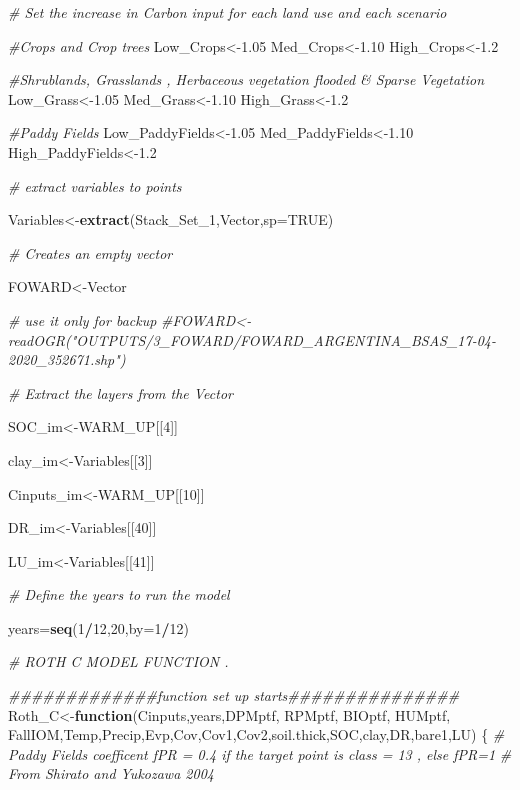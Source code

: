 \documentclass[
  10pt,
  b5paper,
]{book}
\newenvironment{Shaded}{\begin{snugshade}}{\end{snugshade}}
\newcommand{\CommentTok}[1]{\textcolor[rgb]{0.56,0.35,0.01}{\textit{#1}}}
\newcommand{\ControlFlowTok}[1]{\textcolor[rgb]{0.13,0.29,0.53}{\textbf{#1}}}
\newcommand{\DataTypeTok}[1]{\textcolor[rgb]{0.13,0.29,0.53}{#1}}
\newcommand{\DecValTok}[1]{\textcolor[rgb]{0.00,0.00,0.81}{#1}}
\newcommand{\FloatTok}[1]{\textcolor[rgb]{0.00,0.00,0.81}{#1}}
\newcommand{\KeywordTok}[1]{\textcolor[rgb]{0.13,0.29,0.53}{\textbf{#1}}}
\newcommand{\NormalTok}[1]{#1}
\newcommand{\OperatorTok}[1]{\textcolor[rgb]{0.81,0.36,0.00}{\textbf{#1}}}
\newcommand{\OtherTok}[1]{\textcolor[rgb]{0.56,0.35,0.01}{#1}}
\begin{document}
\begin{Shaded}
\begin{Highlighting}[]
\CommentTok{# Set the increase in Carbon input for each land use and each scenario}

\CommentTok{#Crops and Crop trees}
\NormalTok{Low_Crops<-}\FloatTok{1.05}
\NormalTok{Med_Crops<-}\FloatTok{1.10}
\NormalTok{High_Crops<-}\FloatTok{1.2}

\CommentTok{#Shrublands, Grasslands , Herbaceous vegetation flooded & Sparse Vegetation}
\NormalTok{Low_Grass<-}\FloatTok{1.05}
\NormalTok{Med_Grass<-}\FloatTok{1.10}
\NormalTok{High_Grass<-}\FloatTok{1.2}

\CommentTok{#Paddy Fields}
\NormalTok{Low_PaddyFields<-}\FloatTok{1.05}
\NormalTok{Med_PaddyFields<-}\FloatTok{1.10}
\NormalTok{High_PaddyFields<-}\FloatTok{1.2}

\CommentTok{# extract variables to points}

\NormalTok{Variables<-}\KeywordTok{extract}\NormalTok{(Stack_Set_}\DecValTok{1}\NormalTok{,Vector,}\DataTypeTok{sp=}\OtherTok{TRUE}\NormalTok{)}

\CommentTok{# Creates an empty vector}

\NormalTok{FOWARD<-Vector}

\CommentTok{# use it only for backup}
\CommentTok{#FOWARD<-readOGR("OUTPUTS/3_FOWARD/FOWARD_ARGENTINA_BSAS_17-04-2020_352671.shp")}

\CommentTok{# Extract the layers from the Vector}

\NormalTok{SOC_im<-WARM_UP[[}\DecValTok{4}\NormalTok{]]}

\NormalTok{clay_im<-Variables[[}\DecValTok{3}\NormalTok{]] }

\NormalTok{Cinputs_im<-WARM_UP[[}\DecValTok{10}\NormalTok{]]}

\NormalTok{DR_im<-Variables[[}\DecValTok{40}\NormalTok{]]}

\NormalTok{LU_im<-Variables[[}\DecValTok{41}\NormalTok{]]}

\CommentTok{# Define the years to run the model}

\NormalTok{years=}\KeywordTok{seq}\NormalTok{(}\DecValTok{1}\OperatorTok{/}\DecValTok{12}\NormalTok{,}\DecValTok{20}\NormalTok{,}\DataTypeTok{by=}\DecValTok{1}\OperatorTok{/}\DecValTok{12}\NormalTok{)}

\CommentTok{# ROTH C MODEL FUNCTION . }

\CommentTok{#############function set up starts###############}
\NormalTok{Roth_C<-}\ControlFlowTok{function}\NormalTok{(Cinputs,years,DPMptf, RPMptf, BIOptf, HUMptf, FallIOM,Temp,Precip,Evp,Cov,Cov1,Cov2,soil.thick,SOC,clay,DR,bare1,LU)}
\NormalTok{\{}
\CommentTok{# Paddy Fields coefficent fPR = 0.4 if the target point is class = 13 , else fPR=1}
\CommentTok{# From Shirato and Yukozawa 2004}


\end{Highlighting}
\end{Shaded}
\end{document}
